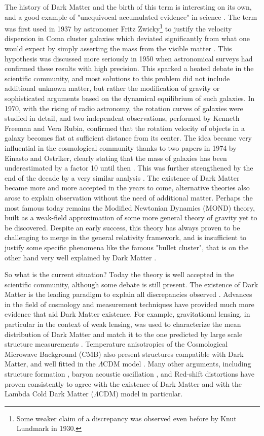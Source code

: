 The history of Dark Matter and the birth of this term is interesting on its own, and a good example of "unequivocal accumulated evidence" in science \cite{hooper, deSwart:2017heh}. The term was first used in 1937 by astronomer Fritz Zwicky\footnote{Some weaker claim of a discrepancy was observed even before by Knut Lundmark in 1930.} to justify the velocity dispersion in Coma cluster galaxies which deviated significantly from what one would expect by simply asserting the mass from the visible matter \cite{1933AcHPh...6..110Z}. This hypothesis was discussed more seriously in 1950 when astronomical surveys had confirmed these results with high precision. This sparked a heated debate in the scientific community, and most solutions to this problem did not include additional unknown matter, but rather the modification of gravity or  sophisticated arguments based on the dynamical equilibrium of such galaxies. In 1970, with the rising of radio astronomy, the rotation curves of galaxies were studied in detail, and two independent observations, performed by Kenneth Freeman and Vera Rubin, confirmed that the rotation velocity of objects in a galaxy becomes flat at sufficient distance from its center. The idea became very influential in the cosmological community thanks to two papers in 1974 by Einasto and Ostriker, clearly stating that the mass of galaxies has been underestimated by a factor 10 until then \cite{EINASTO1974,1974ApJ...193L...1O}. This was further strengthened by the end of the decade by a very similar analysis \cite{annurev.aa.17.090179.001031}. The existence of Dark Matter became more and more accepted in the years to come, alternative theories also arose to explain observation without the need of additional matter. Perhaps the most famous today remains the Modified Newtonian Dynamics (MOND) theory, built as a weak-field approximation of some more general theory of gravity yet to be discovered. Despite an early success, this theory has always proven to be challenging to merge in the general relativity framework, and is insufficient to justify some specific phenomena like the famous "bullet cluster", that is on the other hand very well explained by Dark Matter \cite{Clowe_2006}.

So what is the current situation? Today the theory is well accepted in the scientific community, although some debate is still present. The existence of Dark Matter is the leading paradigm to explain all discrepancies observed \cite{hooper}. Advances in the field of cosmology and measurement techniques have provided much more evidence that aid Dark Matter existence. For example, gravitational lensing, in particular in the context of weak lensing, was used to characterize the mean distribution of Dark Matter and match it to the one predicted by large scale structure measurements \cite{weak-lensing}. Temperature anisotropies of the Cosmological Microwave Background (CMB) also present structures compatible with Dark Matter, and well fitted in the $\Lambda$CDM model \cite{Ade:2015xua}. Many other arguments, including structure formation \cite{Navarro:1995iw}, baryon acoustic oscillation \cite{bao}, and Red-shift distortions \cite{Peacock2001} have proven consistently to agree with the existence of Dark Matter and with the Lambda Cold Dark Matter ($\Lambda$CDM) model in particular.

